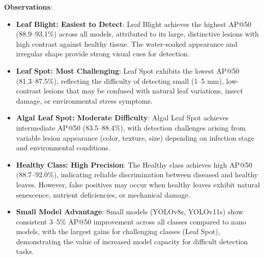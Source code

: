 \begin{table}[!t]
\caption{Per-Class Average Precision (AP@50) for Representative Models}
\label{tab:per_class}
\centering
{}
\end{table}

\textbf{Observations}:

\begin{itemize}
\item \textbf{Leaf Blight: Easiest to Detect}: Leaf Blight achieves the highest AP@50 (88.9--93.1\%) across all models, attributed to its large, distinctive lesions with high contrast against healthy tissue. The water-soaked appearance and irregular shape provide strong visual cues for detection.

\item \textbf{Leaf Spot: Most Challenging}: Leaf Spot exhibits the lowest AP@50 (81.3--87.5\%), reflecting the difficulty of detecting small (1--5 mm), low-contrast lesions that may be confused with natural leaf variations, insect damage, or environmental stress symptoms.

\item \textbf{Algal Leaf Spot: Moderate Difficulty}: Algal Leaf Spot achieves intermediate AP@50 (83.5--88.4\%), with detection challenges arising from variable lesion appearance (color, texture, size) depending on infection stage and environmental conditions.

\item \textbf{Healthy Class: High Precision}: The Healthy class achieves high AP@50 (88.7--92.0\%), indicating reliable discrimination between diseased and healthy leaves. However, false positives may occur when healthy leaves exhibit natural senescence, nutrient deficiencies, or mechanical damage.

\item \textbf{Small Model Advantage}: Small models (YOLOv8s, YOLOv11s) show consistent 3--5\% AP@50 improvement across all classes compared to nano models, with the largest gains for challenging classes (Leaf Spot), demonstrating the value of increased model capacity for difficult detection tasks.
\end{itemize}

